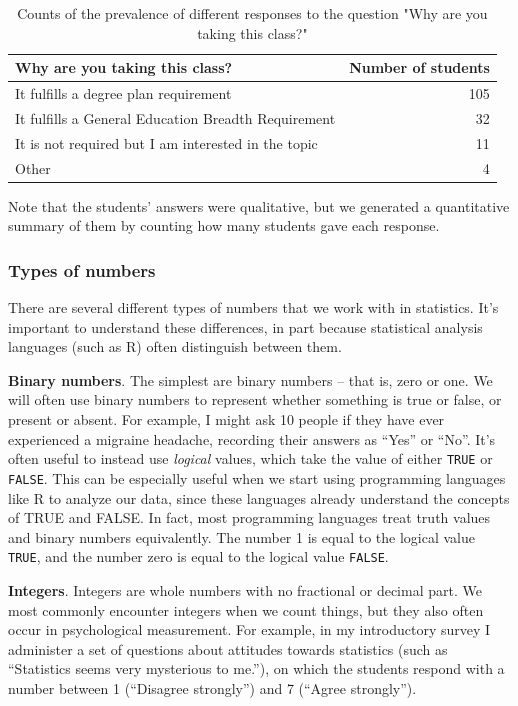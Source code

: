 \documentclass[12pt,]{book}
\theoremstyle{definition}
\theoremstyle{definition}
\theoremstyle{definition}
\theoremstyle{remark}
\begin{document}
\begin{table}

\caption{\label{tab:WhyTakingClass}Counts of the prevalence of different responses to the question "Why are you taking this class?"}
\centering
\begin{tabular}[t]{lr}
\toprule
Why are you taking this class? & Number of students\\
\midrule
It fulfills a degree plan requirement & 105\\
It fulfills a General Education Breadth Requirement & 32\\
It is not required but I am interested in the topic & 11\\
Other & 4\\
\bottomrule
\end{tabular}
\end{table}

Note that the students' answers were qualitative, but we generated a quantitative summary of them by counting how many students gave each response.

\hypertarget{types-of-numbers}{%
\subsubsection{Types of numbers}\label{types-of-numbers}}

There are several different types of numbers that we work with in statistics. It's important to understand these differences, in part because statistical analysis languages (such as R) often distinguish between them.

\textbf{Binary numbers}. The simplest are binary numbers -- that is, zero or one. We will often use binary numbers to represent whether something is true or false, or present or absent. For example, I might ask 10 people if they have ever experienced a migraine headache, recording their answers as ``Yes'' or ``No''. It's often useful to instead use \emph{logical} values, which take the value of either \texttt{TRUE} or \texttt{FALSE}. This can be especially useful when we start using programming languages like R to analyze our data, since these languages already understand the concepts of TRUE and FALSE. In fact, most programming languages treat truth values and binary numbers equivalently. The number 1 is equal to the logical value \texttt{TRUE}, and the number zero is equal to the logical value \texttt{FALSE}.

\textbf{Integers}. Integers are whole numbers with no fractional or decimal part. We most commonly encounter integers when we count things, but they also often occur in psychological measurement. For example, in my introductory survey I administer a set of questions about attitudes towards statistics (such as ``Statistics seems very mysterious to me.''), on which the students respond with a number between 1 (``Disagree strongly'') and 7 (``Agree strongly'').
\end{document}
